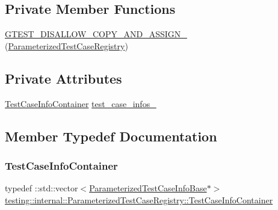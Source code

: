 \subsection*{Private Member Functions}
\begin{DoxyCompactItemize}
\item 
\mbox{\hyperlink{classtesting_1_1internal_1_1_parameterized_test_case_registry_ad4b492ca1c7f0cf14db6dde5f462644d}{G\+T\+E\+S\+T\+\_\+\+D\+I\+S\+A\+L\+L\+O\+W\+\_\+\+C\+O\+P\+Y\+\_\+\+A\+N\+D\+\_\+\+A\+S\+S\+I\+G\+N\+\_\+}} (\mbox{\hyperlink{classtesting_1_1internal_1_1_parameterized_test_case_registry}{Parameterized\+Test\+Case\+Registry}})
\end{DoxyCompactItemize}
\subsection*{Private Attributes}
\begin{DoxyCompactItemize}
\item 
\mbox{\hyperlink{classtesting_1_1internal_1_1_parameterized_test_case_registry_a4b2cde8f4f92749a8f685f33a9a3f7bf}{Test\+Case\+Info\+Container}} \mbox{\hyperlink{classtesting_1_1internal_1_1_parameterized_test_case_registry_a10be2f29d41be96c14d976f0cda3d0f7}{test\+\_\+case\+\_\+infos\+\_\+}}
\end{DoxyCompactItemize}


\subsection{Member Typedef Documentation}
\mbox{\label{classtesting_1_1internal_1_1_parameterized_test_case_registry_a4b2cde8f4f92749a8f685f33a9a3f7bf}} 
\subsubsection{\texorpdfstring{TestCaseInfoContainer}{TestCaseInfoContainer}}
{\footnotesize\ttfamily typedef \+::std\+::vector$<$\mbox{\hyperlink{classtesting_1_1internal_1_1_parameterized_test_case_info_base}{Parameterized\+Test\+Case\+Info\+Base}}$\ast$$>$ \mbox{\hyperlink{classtesting_1_1internal_1_1_parameterized_test_case_registry_a4b2cde8f4f92749a8f685f33a9a3f7bf}{testing\+::internal\+::\+Parameterized\+Test\+Case\+Registry\+::\+Test\+Case\+Info\+Container}}\hspace{0.3cm}{\ttfamily [private]}}



